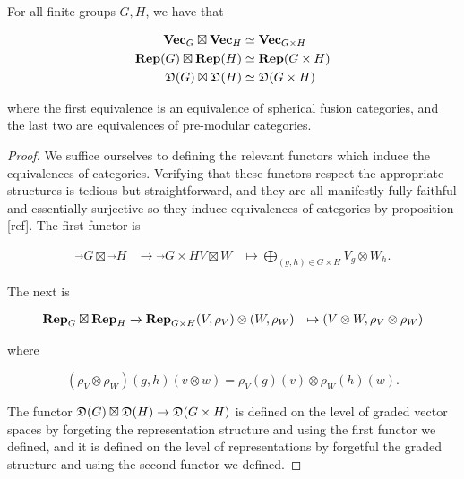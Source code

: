 \begin{prop} For all finite groups $G,H$, we have that

\begin{align*}
{\bf Vec}_{G}\boxtimes {\bf Vec}_H&\simeq {\bf Vec}_{G\times H}\\
{\bf Rep}(G)\boxtimes {\bf Rep}(H)&\simeq {\bf Rep}(G\times H)\\
{\mathfrak D}(G)\boxtimes {\mathfrak D}(H)&\simeq {\mathfrak D}(G\times H)
\end{align*}

where the first equivalence is an equivalence of spherical fusion categories, and the last two are equivalences of pre-modular categories.
\end{prop}
\begin{proof} We suffice ourselves to defining the relevant functors which induce the equivalences of categories. Verifying that these functors respect the appropriate structures is tedious but straightforward, and they are all manifestly fully faithful and essentially surjective so they induce equivalences of categories by proposition [ref]. The first functor is

\begin{align*}
\Vec_{G}\boxtimes \Vec_{H}&\xrightarrow{}\Vec_{G\times H}
V\boxtimes W&\mapsto \bigoplus_{(g,h)\in G\times H}V_g\otimes W_h.
\end{align*}

The next is

\begin{align*}
{\bf Rep}_{G}\boxtimes {\bf Rep}_{H}&\xrightarrow{}{\bf Rep}_{G\times H}
(V,\rho_V)\otimes (W,\rho_W)&\mapsto (V\otimes W, \rho_V\otimes \rho_W)
\end{align*}

where

$$(\rho_V\otimes \rho_W)(g,h)(v\otimes w)=\rho_V(g)(v)\otimes \rho_W(h)(w).$$

The functor ${\mathfrak D}(G)\boxtimes {\mathfrak D}(H)\to {\mathfrak D}(G\times H)$ is defined on the level of graded vector spaces by forgeting the representation structure and using the first functor we defined, and it is defined on the level of representations by forgetful the graded structure and using the second functor we defined.
\end{proof}

\begin{ex}
\end{ex}

